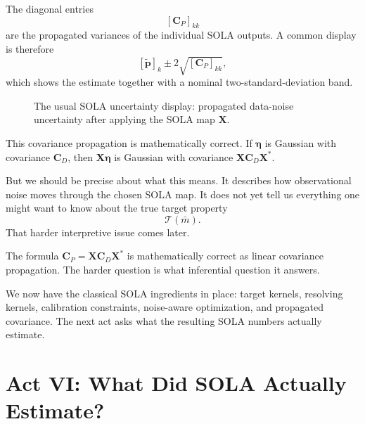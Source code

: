 \documentclass[11pt,openany]{book}
\theoremstyle{definition}
\theoremstyle{remark}
\newcommand{\Tau}{\mathcal{T}}
\begin{document}
The diagonal entries
\[
  [\mathbf C_P]_{kk}
\]
are the propagated variances of the individual SOLA outputs. A common display is therefore
\[
  [\widetilde{\mathbf p}]_k
  \pm
  2\sqrt{[\mathbf C_P]_{kk}},
\]
which shows the estimate together with a nominal two-standard-deviation band.

\begin{figure}[ht]
  \centering
  \caption{The usual SOLA uncertainty display: propagated data-noise uncertainty after applying
  the SOLA map \(\mathbf X\).}
  \label{fig:act5-propagated-covariance}
\end{figure}

This covariance propagation is mathematically correct. If \(\boldsymbol\eta\) is Gaussian with
covariance \(\mathbf C_D\), then \(\mathbf X\boldsymbol\eta\) is Gaussian with covariance
\(\mathbf X\mathbf C_D\mathbf X^*\).

But we should be precise about what this means. It describes how observational noise moves
through the chosen SOLA map. It does not yet tell us everything one might want to know about
the true target property
\[
  \Tau(\bar m).
\]
That harder interpretive issue comes later.

\begin{checkpointbox}
The formula \(\mathbf C_P=\mathbf X\mathbf C_D\mathbf X^*\) is mathematically correct as linear
covariance propagation. The harder question is what inferential question it answers.
\end{checkpointbox}

We now have the classical SOLA ingredients in place: target kernels, resolving kernels,
calibration constraints, noise-aware optimization, and propagated covariance. The next act asks
what the resulting SOLA numbers actually estimate.


\part{Act VI: What Did SOLA Actually Estimate?}
\end{document}
